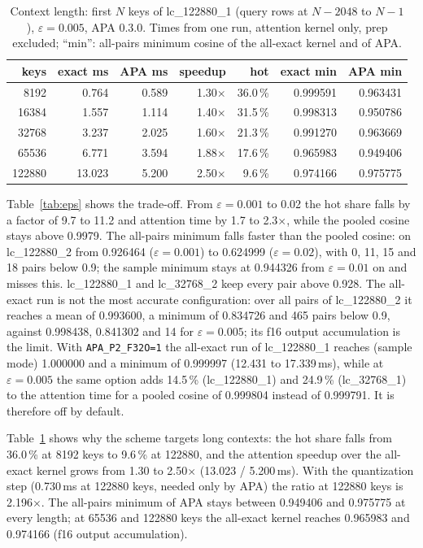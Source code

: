 \documentclass[10pt,twocolumn]{article}
\newcommand{\eps}{\varepsilon}
\newcommand{\code}[1]{\texttt{#1}}
\begin{document}
\begin{table}[t]
\centering\footnotesize
\setlength{\tabcolsep}{2pt}
\begin{tabular}{@{}rrrrrrr@{}}
\toprule
keys & exact ms & APA ms & speedup & hot & exact min & APA min \\
\midrule
8192 & 0.764 & 0.589 & 1.30$\times$ & 36.0\,\% & 0.999591 & 0.963431 \\
16384 & 1.557 & 1.114 & 1.40$\times$ & 31.5\,\% & 0.998313 & 0.950786 \\
32768 & 3.237 & 2.025 & 1.60$\times$ & 21.3\,\% & 0.991270 & 0.963669 \\
65536 & 6.771 & 3.594 & 1.88$\times$ & 17.6\,\% & 0.965983 & 0.949406 \\
122880 & 13.023 & 5.200 & 2.50$\times$ & 9.6\,\% & 0.974166 & 0.975775 \\
\bottomrule
\end{tabular}
\caption{Context length: first $N$ keys of lc\_122880\_1 (query rows at $N-2048$ to $N-1$), $\eps=0.005$,
APA 0.3.0. Times from one run, attention kernel only, prep excluded; ``min'': all-pairs minimum cosine of the
all-exact kernel and of APA.}
\label{tab:kv}
\end{table}

Table~\ref{tab:eps} shows the trade-off. From $\eps=0.001$ to 0.02 the hot share falls by a factor of 9.7
to 11.2 and attention time by 1.7 to 2.3$\times$, while the pooled cosine stays above 0.9979. The all-pairs
minimum falls faster than the pooled cosine: on lc\_122880\_2 from 0.926464 ($\eps=0.001$) to 0.624999
($\eps=0.02$), with 0, 11, 15 and 18 pairs below 0.9; the sample minimum stays at 0.944326 from $\eps=0.01$
on and misses this. lc\_122880\_1 and lc\_32768\_2 keep every pair above 0.928. The all-exact run is not the most accurate configuration: over all pairs of
lc\_122880\_2 it reaches a mean of 0.993600, a minimum of 0.834726 and 465 pairs below 0.9, against 0.998438,
0.841302 and 14 for $\eps=0.005$; its f16 output accumulation is the limit. With \code{APA\_P2\_F32O=1} the
all-exact run of lc\_122880\_1 reaches (sample mode) 1.000000 and a minimum of 0.999997 (12.431 to
17.339\,ms), while at $\eps=0.005$ the same option adds 14.5\,\% (lc\_122880\_1) and 24.9\,\% (lc\_32768\_1)
to the attention time for a pooled cosine of 0.999804 instead of 0.999791. It is therefore off by default.

Table~\ref{tab:kv} shows why the scheme targets long contexts: the hot share falls from 36.0\,\% at 8192
keys to 9.6\,\% at 122880, and the attention speedup over the all-exact kernel grows from 1.30 to
2.50$\times$ (13.023 / 5.200\,ms). With the quantization step (0.730\,ms at 122880 keys, needed only by APA)
the ratio at 122880 keys is 2.196$\times$. The all-pairs minimum of APA stays between 0.949406 and 0.975775 at
every length; at 65536 and 122880 keys the all-exact kernel reaches 0.965983 and 0.974166 (f16 output
accumulation).
\end{document}
